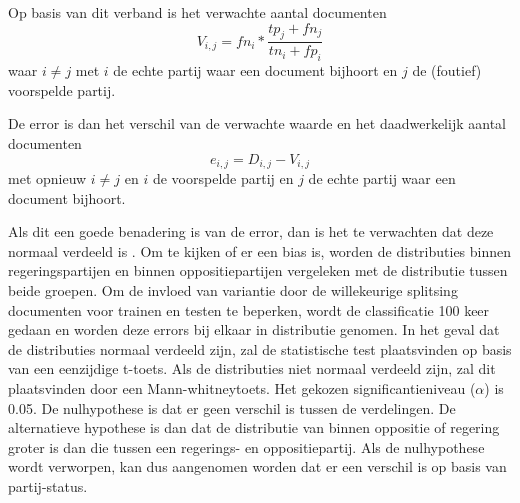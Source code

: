 Op basis van dit verband is het verwachte aantal documenten
\begin{equation}
\label{eq:expected}
V_{i,j}  = fn_i *  \frac{tp_{j}+fn_{j}}{tn_{i}+fp_{i}}
\end{equation}
waar $i\neq j$ met $i$ de echte partij waar een document bijhoort en $j$ de (foutief) voorspelde partij.\par
De error is dan het verschil van de verwachte waarde en het daadwerkelijk aantal documenten
\begin{equation}
\label{eq:error}
e_{i,j} = D_{i,j} - V_{i,j}
\end{equation}
met opnieuw $i\neq j$ en $i$ de voorspelde partij en $j$ de echte partij waar een document bijhoort. \par
Als dit een goede benadering is van de error, dan is het te verwachten dat deze normaal verdeeld is \cite{citeulike:7531484}. Om te kijken of er een bias is, worden de distributies binnen regeringspartijen en binnen oppositiepartijen vergeleken met de distributie tussen beide groepen. Om de invloed van variantie door de willekeurige splitsing documenten voor trainen en testen te beperken, wordt de classificatie 100 keer gedaan en worden deze errors bij elkaar in distributie genomen. In het geval dat de distributies normaal verdeeld zijn, zal de statistische test plaatsvinden op basis van een eenzijdige t-toets. Als de distributies niet normaal verdeeld zijn, zal dit plaatsvinden door een Mann-whitneytoets. Het gekozen significantieniveau ($\alpha$) is 0.05. De nulhypothese is dat er geen verschil is tussen de verdelingen. De alternatieve hypothese is dan dat de distributie van binnen oppositie of regering groter is dan die tussen een regerings- en oppositiepartij. Als de nulhypothese wordt verworpen, kan dus aangenomen worden dat er een verschil is op basis van partij-status.\par

